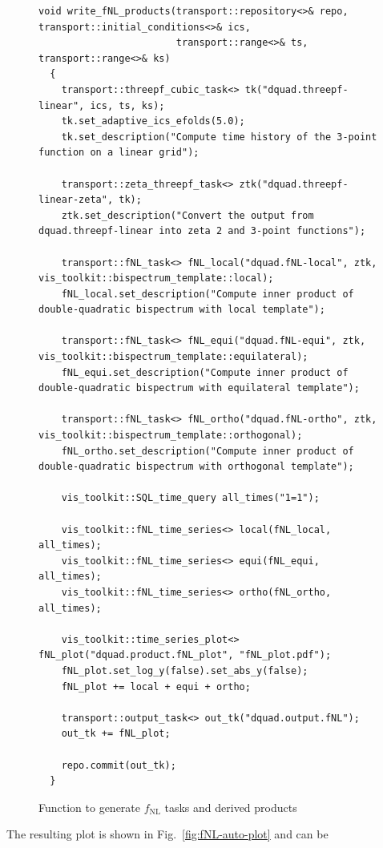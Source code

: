 \documentclass[11pt,a4paper]{article}
\newcommand{\fNL}{f_{\mathrm{NL}}}
\begin{document}
\begin{figure}
\begin{minipage}[t][15cm]{\textwidth}
\begin{verbatim}
void write_fNL_products(transport::repository<>& repo, transport::initial_conditions<>& ics,
                        transport::range<>& ts, transport::range<>& ks)
  {
    transport::threepf_cubic_task<> tk("dquad.threepf-linear", ics, ts, ks);
    tk.set_adaptive_ics_efolds(5.0);
    tk.set_description("Compute time history of the 3-point function on a linear grid");

    transport::zeta_threepf_task<> ztk("dquad.threepf-linear-zeta", tk);
    ztk.set_description("Convert the output from dquad.threepf-linear into zeta 2 and 3-point functions");

    transport::fNL_task<> fNL_local("dquad.fNL-local", ztk, vis_toolkit::bispectrum_template::local);
    fNL_local.set_description("Compute inner product of double-quadratic bispectrum with local template");

    transport::fNL_task<> fNL_equi("dquad.fNL-equi", ztk, vis_toolkit::bispectrum_template::equilateral);
    fNL_equi.set_description("Compute inner product of double-quadratic bispectrum with equilateral template");

    transport::fNL_task<> fNL_ortho("dquad.fNL-ortho", ztk, vis_toolkit::bispectrum_template::orthogonal);
    fNL_ortho.set_description("Compute inner product of double-quadratic bispectrum with orthogonal template");

    vis_toolkit::SQL_time_query all_times("1=1");

    vis_toolkit::fNL_time_series<> local(fNL_local, all_times);
    vis_toolkit::fNL_time_series<> equi(fNL_equi, all_times);
    vis_toolkit::fNL_time_series<> ortho(fNL_ortho, all_times);

    vis_toolkit::time_series_plot<> fNL_plot("dquad.product.fNL_plot", "fNL_plot.pdf");
    fNL_plot.set_log_y(false).set_abs_y(false);
    fNL_plot += local + equi + ortho;

    transport::output_task<> out_tk("dquad.output.fNL");
    out_tk += fNL_plot;

    repo.commit(out_tk);
  }
\end{verbatim}
\end{minipage}
\caption{\label{code:fNL-code}Function to generate $\fNL$ tasks and derived products}
\end{figure}
The resulting plot is shown in Fig.~\ref{fig:fNL-auto-plot} and can be
\end{document}
